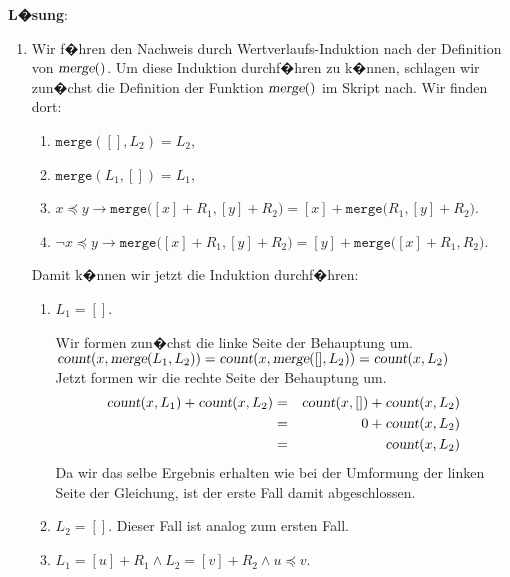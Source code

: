 \documentclass{article}
\renewcommand{\labelenumi}{(\alph{enumi})}
\renewcommand{\labelenumii}{\arabic{enumii}.}
\begin{document}
\noindent
\textbf{L�sung}:
\begin{enumerate}
\item Wir f�hren den Nachweis durch Wertverlaufs-Induktion nach der Definition von $\textsl{merge}()$.
      Um diese Induktion durchf�hren zu k�nnen, schlagen wir zun�chst die Definition der Funktion 
      $\textsl{merge}()$ im Skript nach.  Wir finden dort:
      \begin{enumerate}
        \renewcommand{\labelenumi}{\arabic{enumi}.}
      \item $\mathtt{merge}([], L_2) = L_2$,
      \item $\mathtt{merge}(L_1, []) = L_1$,
      \item $x \preceq y \rightarrow 
             \mathtt{merge}\bigl([x]+R_1, [y]+R_2\bigr) = [x] + \mathtt{merge}\bigl(R_1,[y]+R_2\bigr)$.
           \item $\neg x \preceq y \rightarrow 
                  \mathtt{merge}\bigl([x]+R_1, [y]+R_2\bigr) = [y] + \mathtt{merge}\bigl([x] + R_1,R_2\bigr)$.
      \end{enumerate}
      Damit k�nnen wir jetzt die Induktion durchf�hren:
      \begin{enumerate}
        \renewcommand{\labelenumii}{\arabic{enumii}.}
      \item $L_1 = []$.  

            Wir formen zun�chst die linke Seite der Behauptung um.
            \\[0.2cm]
            \hspace*{1.3cm}
            $\textsl{count}(x, \textsl{merge}(L_1, L_2)) = \textsl{count}(x, \textsl{merge}([], L_2))
             = \textsl{count}(x, L_2)$
            \\[0.2cm]
            Jetzt formen wir die rechte Seite der Behauptung um.
            \begin{eqnarray*}
                  \textsl{count}(x, L_1) + \textsl{count}(x, L_2) 
            & = & \textsl{count}(x, []) + \textsl{count}(x, L_2)   \\
            & = & 0 + \textsl{count}(x, L_2)                       \\
            & = & \textsl{count}(x, L_2)
            \end{eqnarray*}
            Da wir das selbe Ergebnis erhalten wie bei der Umformung der linken Seite der Gleichung,
            ist der erste Fall damit abgeschlossen.
      \item $L_2 = []$.  Dieser Fall ist analog zum ersten Fall.
      \item $L_1 = [u] + R_1 \wedge L_2 = [v] + R_2 \wedge u \preceq v$.


\end{enumerate}
\end{enumerate}
\end{document}
